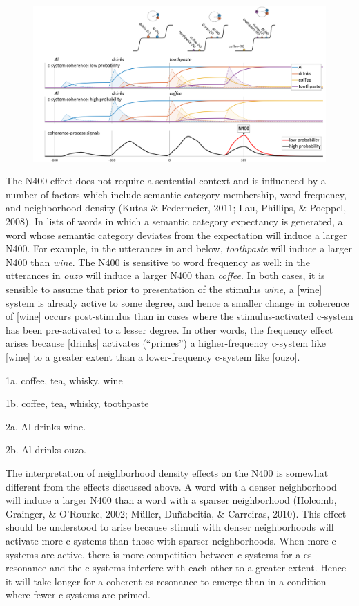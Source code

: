   
\begin{figure}
\includegraphics[width=\textwidth]{figures/Tilsen-img143.png}
\caption{\missingcaption}
\label{fig:}
\end{figure}
 

The N400 effect does not require a sentential context and is influenced by a number of factors which include semantic category membership, word frequency, and neighborhood density (Kutas \& Federmeier, 2011; Lau, Phillips, \& Poeppel, 2008). In lists of words in which a semantic category expectancy is generated, a word whose semantic category deviates from the expectation will induce a larger N400. For example, in the utterances in  and  below, \textit{toothpaste} will induce a larger N400 than \textit{wine}. The N400 is sensitive to word frequency as well: in the utterances in  \textit{ouzo} will induce a larger N400 than \textit{coffee}. In both cases, it is sensible to assume that prior to presentation of the stimulus \textit{wine}, a [wine] system is already active to some degree, and hence a smaller change in coherence of [wine] occurs post-stimulus than in cases where the stimulus-activated c-system has been pre-activated to a lesser degree. In other words, the frequency effect arises because [drinks] activates (“primes”) a higher-frequency c-system like [wine] to a greater extent than a lower-frequency c-system like [ouzo].

  1a. coffee, tea, whisky, wine

  1b. coffee, tea, whisky, toothpaste

  2a. Al drinks wine.

  2b. Al drinks ouzo.

  The interpretation of neighborhood density effects on the N400 is somewhat different from the effects discussed above. A word with a denser neighborhood will induce a larger N400 than a word with a sparser neighborhood (Holcomb, Grainger, \& O’Rourke, 2002; Müller, Duñabeitia, \& Carreiras, 2010). This effect should be understood to arise because stimuli with denser neighborhoods will activate more c-systems than those with sparser neighborhoods. When more c-systems are active, there is more competition between c-systems for a cs-resonance and the c-systems interfere with each other to a greater extent. Hence it will take longer for a coherent cs-resonance to emerge than in a condition where fewer c-systems are primed. 

